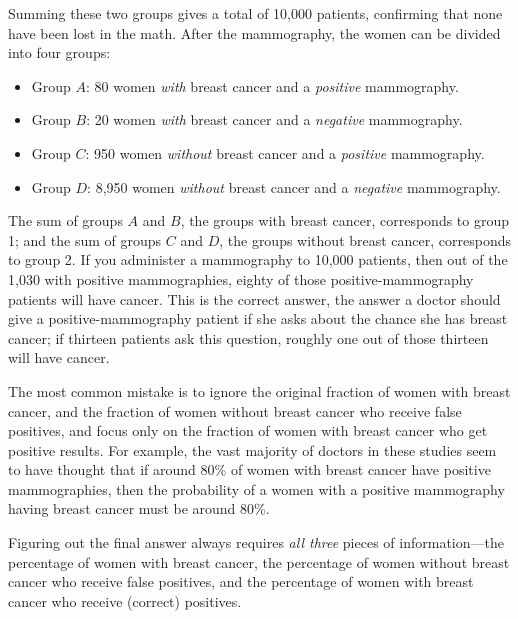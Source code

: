 {{{
 Summing these two groups gives a total of 10,000 patients,
confirming that none have been lost in the math. After the mammography,
the women can be divided into four groups:}


\begin{itemize}
\item{
 Group $A$: 80 women \textit{with} breast cancer and a
\textit{positive} mammography.}

\item{
 Group $B$: 20 women \textit{with} breast cancer and a
\textit{negative} mammography.}

\item{
 Group $C$: 950 women \textit{without} breast cancer and a
\textit{positive} mammography.}

\item {
 Group $D$: 8,950 women \textit{without} breast cancer and a
 \textit{negative} mammography.}
\end{itemize}

{
 The sum of groups $A$ and $B$, the groups with breast cancer,
corresponds to group 1; and the sum of groups $C$ and $D$, the groups
without breast cancer, corresponds to group 2. If you administer a
mammography to 10,000 patients, then out of the 1,030 with positive
mammographies, eighty of those positive-mammography patients will have
cancer. This is the correct answer, the answer a doctor should give a
positive-mammography patient if she asks about the chance she has
breast cancer; if thirteen patients ask this question, roughly one out
of those thirteen will have cancer.}

\hr

{
 The most common mistake is to ignore the original fraction of
women with breast cancer, and the fraction of women without breast
cancer who receive false positives, and focus only on the fraction of
women with breast cancer who get positive results. For example, the
vast majority of doctors in these studies seem to have thought that if
around 80\% of women with breast cancer have positive mammographies,
then the probability of a women with a positive mammography having
breast cancer must be around 80\%.}

{
 Figuring out the final answer always requires \textit{all three}
pieces of information---the percentage of women with breast cancer, the
percentage of women without breast cancer who receive false positives,
and the percentage of women with breast cancer who receive (correct)
positives.}

}}
